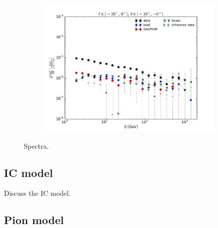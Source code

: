 \begin{figure}
{\begin{subfigure}[b]{.4\textwidth}
		\end{subfigure}%
		\begin{subfigure}[b]{.4\textwidth}
		\centering \includegraphics[width=.95\textwidth]{plots/SED_all_left-right__l=-5_b=-8.pdf}
	\end{subfigure}%
}
\caption{Spectra.}
\label{Spectra_all}
\end{figure}



\subsection{IC model}

Discuss the IC model.


\subsection{Pion model}